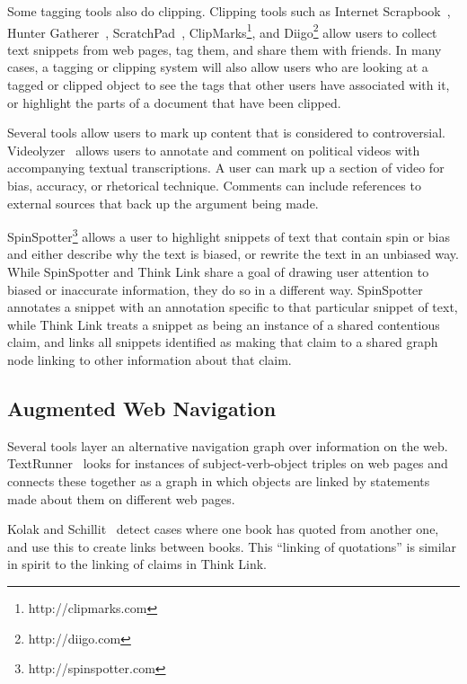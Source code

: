 \documentclass{chi2009}
\begin{document}
Some tagging tools also do clipping. Clipping tools such as Internet Scrapbook~\cite{Sugiura19998}, Hunter Gatherer~\cite{2002}, ScratchPad~\cite{Gotz2007}, ClipMarks\footnote{http://clipmarks.com}, and Diigo\footnote{http://diigo.com} allow users to collect text snippets from web pages, tag them, and share them with friends. In many cases, a tagging or clipping system will also allow users who are looking at a tagged or clipped object to see the tags that other users have associated with it, or highlight the parts of a document that have been clipped.

Several tools allow users to mark up content that is considered to controversial. Videolyzer~\cite{Diakopoulos2008} allows users to annotate and comment on political videos with accompanying textual transcriptions. A user can mark up a section of video for bias, accuracy, or rhetorical technique. Comments can include references to external sources that back up the argument being made. 

SpinSpotter\footnote{http://spinspotter.com} allows a user to highlight snippets of text that contain spin or bias and either describe why the text is biased, or rewrite the text in an unbiased way. While SpinSpotter and Think Link share a goal of drawing user attention to biased or inaccurate information, they do so in a different way. SpinSpotter annotates a snippet with an annotation specific to that particular snippet of text, while Think Link treats a snippet as being an instance of a shared contentious claim, and links all snippets identified as making that claim to a shared graph node linking to other information about that claim.

\subsection{Augmented Web Navigation}

Several tools layer an alternative navigation graph over information on the web. TextRunner~\cite{Etzioni2008} looks for instances of subject-verb-object triples on web pages and connects these together as a graph in which objects are linked by statements made about them on different web pages. 

Kolak and Schillit~\cite{Kolak2008} detect cases where one book has quoted from another one, and use this to create links between books. This ``linking of quotations'' is similar in spirit to the linking of claims in Think Link. 
\end{document}
